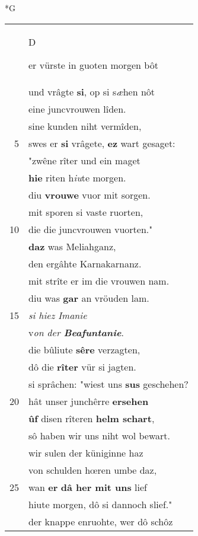 \documentclass[8pt,a4paper,notitlepage]{article}
\begin{document}
\begin{table}[ht]
\begin{minipage}[t]{0.5\linewidth}
\small
\begin{center}*G
\end{center}
\begin{tabular}{rl}
 & \begin{large}D\end{large}er vürste in guoten morgen bôt\\ 
 & und vrâgte \textbf{si}, op si s\textit{æ}hen nôt\\ 
 & eine juncvrouwen lîden.\\ 
 & sine kunden niht vermîden,\\ 
5 & swes er \textbf{si} vrâgete, \textbf{ez} wart gesaget:\\ 
 & "zwêne rîter und ein maget\\ 
 & \textbf{hie} riten h\textit{iu}te morgen.\\ 
 & diu \textbf{vrouwe} vuor mit sorgen.\\ 
 & mit sporen si vaste ruorten,\\ 
10 & die die juncvrouwen vuorten."\\ 
 & \textbf{daz} was Meliahganz,\\ 
 & den ergâhte Karnakarnanz.\\ 
 & mit strîte er im die vrouwen nam.\\ 
 & diu was \textbf{gar} an vröuden lam.\\ 
15 & \textit{si hiez Imanie}\\ 
 & v\textit{on der \textbf{Beafuntanie}}.\\ 
 & die bûliute \textbf{sêre} verzagten,\\ 
 & dô die \textbf{rîter} vür si jagten.\\ 
 & si sprâchen: "wiest uns \textbf{sus} geschehen?\\ 
20 & hât unser junchêrre \textbf{ersehen}\\ 
 & \textbf{ûf} disen rîteren \textbf{helm schart},\\ 
 & sô haben wir uns niht wol bewart.\\ 
 & wir sulen der küniginne haz\\ 
 & von schulden hœren umbe daz,\\ 
25 & wan \textbf{er} \textbf{dâ her mit uns} lief\\ 
 & hiute morgen, dô si dannoch slief."\\ 
 & der knappe enruohte, wer dô schôz\\ 

\end{tabular}
\end{minipage}
\end{table}
\end{document}
